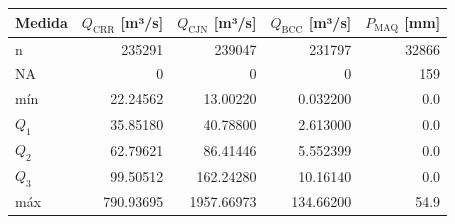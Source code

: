 \documentclass[varwidth=false]{standalone}
\begin{document}
\begin{tabular}{|l|r|r|r|r|}
  \hline
\textbf{Medida} & $Q_\mathrm{CRR}$ [m³/s] & $Q_\mathrm{CJN}$ [m³/s] & $Q_\mathrm{BCC}$ [m³/s] & $P_\mathrm{MAQ}$ [mm]\\
  \hline
  n & 235291 & 239047 & 231797 & 32866\\
  \hline
  NA & 0 & 0 & 0 & 159\\
  \hline
  mín & 22.24562 & 13.00220 & 0.032200 & 0.0\\
  \hline
  $Q_1$ & 35.85180 & 40.78800 & 2.613000 & 0.0\\
  \hline
  $Q_2$ & 62.79621 & 86.41446 & 5.552399 & 0.0\\
  \hline
  $Q_3$ & 99.50512 & 162.24280 & 10.16140 & 0.0\\
  \hline
  máx & 790.93695 & 1957.66973 & 134.66200 & 54.9\\
  \hline
\end{tabular}
\end{document}
